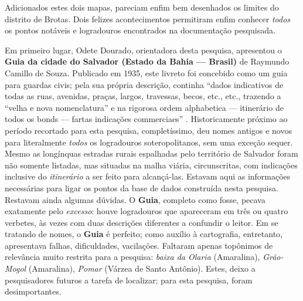 Adicionados estes dois mapas, pareciam enfim bem desenhados os limites do distrito de Brotas. Dois felizes acontecimentos permitiram enfim conhecer \textit{todos} os pontos notáveis e logradouros encontrados na documentação pesquisada.

Em primeiro lugar, Odete Dourado, orientadora desta pesquisa, apresentou o \textbf{Guia da cidade do Salvador (Estado da Bahia --- Brasil)} de Raymundo Camillo de Souza. Publicado em 1935, este livreto foi concebido como um guia para guardas civis; pela sua própria descrição, continha ``dados indicativos de todas as ruas, avenidas, praças, largos, travessas, becos, etc., etc., trazendo a ``velha e nova nomenclatura'' e na rigorosa ordem alphabetica --- itinerário de todos os bonds --- fartas indicações commerciaes'' \cite{souza_guia_1935}. Historicamente próximo ao período recortado para esta pesquisa, completíssimo, deu nomes antigos e novos para literalmente \textit{todos} os logradouros soteropolitanos, sem uma exceção sequer. Mesmo as longínquas estradas rurais espalhadas pelo território de Salvador foram não somente listadas, mas situadas na malha viária, circunscritas, com indicações inclusive do \textit{itinerário} a ser feito para alcançá-las. Estavam aqui as informações necessárias para ligar os pontos da base de dados construída nesta pesquisa. Restavam ainda algumas dúvidas. O \textbf{Guia}, completo como fosse, pecava exatamente pelo \textit{excesso}: houve logradouros que apareceram em três ou quatro verbetes, às vezes com duas descrições diferentes a confundir o leitor. Em se tratando de nomes, o \textbf{Guia} é perfeito; como auxílio à cartografia, entretanto, apresentava falhas, dificuldades, vacilações. Faltaram apenas topônimos de relevância muito restrita para a pesquisa: \textit{baixa da Olaria} (Amaralina), \textit{Grão-Mogol} (Amaralina), \textit{Pomar} (Várzea de Santo Antônio). Estes, deixo a pesquisadores futuros a tarefa de localizar; para esta pesquisa, foram desimportantes.

